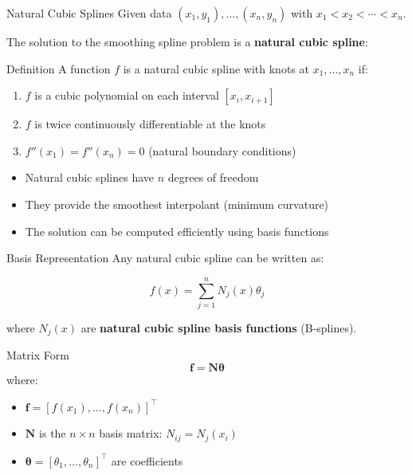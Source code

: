 \documentclass[aspectratio=169]{beamer}
\begin{document}
\begin{frame}{Natural Cubic Splines}
Given data $(x_1,y_1), \ldots, (x_n,y_n)$ with $x_1 < x_2 < \cdots < x_n$.

The solution to the smoothing spline problem is a \textbf{natural cubic spline}:

\begin{block}{Definition}
A function $f$ is a natural cubic spline with knots at $x_1, \ldots, x_n$ if:
\begin{enumerate}
    \item $f$ is a cubic polynomial on each interval $[x_i, x_{i+1}]$
    \item $f$ is twice continuously differentiable at the knots
    \item $f''(x_1) = f''(x_n) = 0$ (natural boundary conditions)
\end{enumerate}
\end{block}

\begin{itemize}
    \item Natural cubic splines have $n$ degrees of freedom
    \item They provide the smoothest interpolant (minimum curvature)
    \item The solution can be computed efficiently using basis functions
\end{itemize}
\end{frame}

\begin{frame}{Basis Representation}
Any natural cubic spline can be written as:

\[
f(x) = \sum_{j=1}^{n} N_j(x) \theta_j
\]

where $N_j(x)$ are \textbf{natural cubic spline basis functions} (B-splines).

\begin{block}{Matrix Form}
\[
\mathbf{f} = \mathbf{N} \boldsymbol{\theta}
\]
where:
\begin{itemize}
    \item $\mathbf{f} = [f(x_1), \ldots, f(x_n)]^\top$
    \item $\mathbf{N}$ is the $n \times n$ basis matrix: $N_{ij} = N_j(x_i)$
    \item $\boldsymbol{\theta} = [\theta_1, \ldots, \theta_n]^\top$ are coefficients
\end{itemize}
\end{block}
\end{frame}
\end{document}
